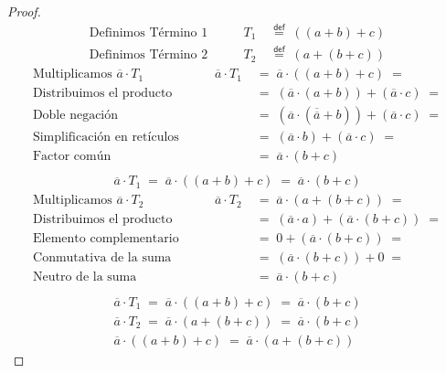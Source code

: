 \documentclass[final,12pt,a4paper,twoside,fleqn]{extbook}
\newcommand{\mathdef}{\ensuremath{\stackrel{\mathsf{def}}{{}={}}}}
\theoremstyle{definition}
\theoremstyle{remark}
\begin{document}
\begin{proof}
\begin{align}
\text{Definimos Término 1}\qquad& T_1 \;&\mathdef\; \left( \left( a + b \right) + c \right) \\
\text{Definimos Término 2}\qquad& T_2 \;&\mathdef\; \left( a + \left( b + c \right) \right)
\end{align}
\begin{align}
\text{Multiplicamos \(\overline{a} \cdot T_1\)}\qquad& \overline{a} \cdot T_1 \;&=\; \overline{a} \cdot \left( \left( a + b \right) + c \right) \;=\\
\text{Distribuimos el producto}\qquad&{}&=\; \left( \overline{a} \cdot \left( a + b \right) \right) + \left( \overline{a} \cdot c \right) \;=\\
\text{Doble negación}\qquad&{}&=\; \left( \overline{a} \cdot \left( \overline{\overline{a}} + b \right) \right) + \left( \overline{a} \cdot c \right) \;=\\
\text{Simplificación en retículos}\qquad&{}&=\; \left( \overline{a} \cdot b \right) + \left( \overline{a} \cdot c \right) \;=\\
\text{Factor común}\qquad&{}&=\; \overline{a} \cdot \left( b +  c \right) \;\;\\
\end{align}
\begin{align}
\overline{a} \cdot T_1 \;=\; \overline{a} \cdot \left( \left( a + b \right) + c \right) \;=\; \overline{a} \cdot \left( b + c \right)
\end{align}
\begin{align}
\text{Multiplicamos \(\overline{a} \cdot T_2\)}\qquad& \overline{a} \cdot T_2 \;&=\; \overline{a} \cdot \left( a + \left( b  + c \right) \right) \;=\\
\text{Distribuimos el producto}\qquad&{}&=\; \left( \overline{a} \cdot a \right) + \left( \overline{a} \cdot \left( b + c \right) \right) \;=\\
\text{Elemento complementario}\qquad&{}&=\; 0 + \left( \overline{a} \cdot \left( b + c \right) \right) \;=\\
\text{Conmutativa de la suma}\qquad&{}&=\; \left( \overline{a} \cdot \left( b + c \right) \right) + 0 \;=\\
\text{Neutro de la suma}\qquad&{}&=\; \overline{a} \cdot \left( b + c \right) \;\;\\
\end{align}
\begin{align}
\overline{a} \cdot T_1 \;=\; \overline{a} \cdot \left( \left( a + b \right) + c \right) \;=\; \overline{a} \cdot \left( b + c \right)\\
\overline{a} \cdot T_2 \;=\; \overline{a} \cdot \left( a + \left( b + c \right) \right) \;=\; \overline{a} \cdot \left( b + c \right)\\
\overline{a} \cdot \left( \left( a + b \right) + c \right) \;=\; \overline{a} \cdot \left( a + \left( b + c \right) \right) 
\end{align}
\end{proof}
\end{document}
